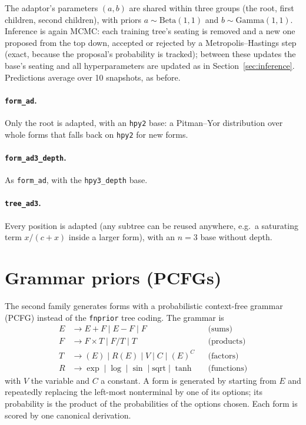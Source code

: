 \documentclass[11pt]{article}
\begin{document}
The adaptor's parameters $(a, b)$ are shared within three groups (the root, first children, second
children), with priors $a \sim \mathrm{Beta}(1,1)$ and $b \sim \mathrm{Gamma}(1,1)$. Inference is again
MCMC: each training tree's seating is removed and a new one proposed from the top down, accepted or
rejected by a Metropolis--Hastings step (exact, because the proposal's probability is tracked); between
these updates the base's seating and all hyperparameters are updated as in
Section~\ref{sec:inference}. Predictions average over 10 snapshots, as before.

\paragraph{\texttt{form\_ad}.} Only the root is adapted, with an \texttt{hpy2} base: a Pitman--Yor
distribution over whole forms that falls back on \texttt{hpy2} for new forms.

\paragraph{\texttt{form\_ad3\_depth}.} As \texttt{form\_ad}, with the \texttt{hpy3\_depth} base.

\paragraph{\texttt{tree\_ad3}.} Every position is adapted (any subtree can be reused anywhere, e.g.\ a
saturating term $x/(c+x)$ inside a larger form), with an $n=3$ base without depth.

\section{Grammar priors (PCFGs)}\label{sec:pcfg}

The second family generates forms with a probabilistic context-free grammar (PCFG) instead of the
\texttt{fnprior} tree coding. The grammar is
\begin{align*}
  E &\to E + F \mid E - F \mid F && \text{(sums)}\\
  F &\to F \times T \mid F / T \mid T && \text{(products)}\\
  T &\to (E) \mid R(E) \mid V \mid C \mid (E)^{C} && \text{(factors)}\\
  R &\to \exp \mid \log \mid \sin \mid \mathrm{sqrt} \mid \tanh && \text{(functions)}
\end{align*}
with $V$ the variable and $C$ a constant. A form is generated by starting from $E$ and repeatedly
replacing the left-most nonterminal by one of its options; its probability is the product of the
probabilities of the options chosen. Each form is scored by one canonical derivation.
\end{document}
